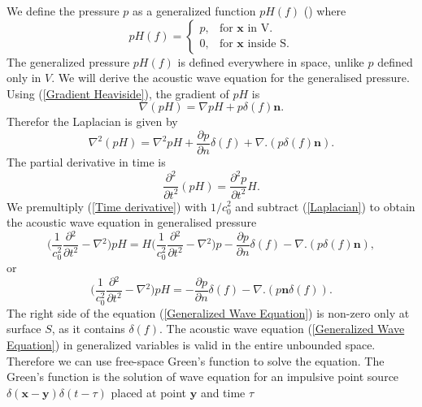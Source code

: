 \documentclass[a4paper]{article}
\begin{document}
We define the pressure $p$ as a generalized function $pH(f)$ (\cite{ffowcs1969sound}) where
\begin{equation}\label{Generalized_Functions}
	p H(f) =\begin{cases}
	p , & \text{for $\mathbf{x}$ in V}.\\
	0, & \text{for $\mathbf{x}$ inside S}.
	\end{cases}
\end{equation}
The generalized pressure $pH(f)$ is defined everywhere in space, unlike $p$ defined only in $V$. We will derive the acoustic wave equation for the generalised pressure. Using (\ref{Gradient Heaviside}), the gradient of $pH$ is
\begin{equation}
	\nabla (pH) = \nabla p H + p \delta(f)\mathbf{n}.
\end{equation}
Therefor the Laplacian is given by
\begin{equation}\label{Laplacian}
	\nabla^2 (pH) = \nabla^2 p H +  \frac{\partial p}{\partial n}\delta(f) + \nabla.(p \delta(f)\mathbf{n}).
\end{equation}
The partial derivative in time is
\begin{equation}\label{Time derivative}
	\frac{\partial^2}{\partial t^2}(pH) = \frac{\partial^2 p }{\partial t^2}H.
\end{equation}
We premultiply (\ref{Time derivative}) with $1/{c_{0}^2}$ and subtract (\ref{Laplacian}) to obtain the acoustic wave equation in generalised pressure
\begin{equation}
	\Bigg( \frac{1}{c_{0}^2}\frac{\partial{}^{2}}{\partial{t}^{2}}- \nabla{}^{2} \Bigg) pH = H\Bigg( \frac{1}{c_{0}^2}\frac{\partial{}^{2}}{\partial{t}^{2}}- \nabla{}^{2} \Bigg) p - \frac{\partial p}{\partial n}\delta(f) - \nabla.(p \delta(f)\mathbf{n}), 
\end{equation}
or
\begin{equation}\label{Generalized Wave Equation}
	\Bigg( \frac{1}{c_{0}^2}\frac{\partial{}^{2}}{\partial{t}^{2}}- \nabla{}^{2} \Bigg) pH = -\frac{\partial p}{\partial n}\delta(f) - \nabla.(p \mathbf{n} \delta(f)). 
\end{equation}
The right side of the equation (\ref{Generalized Wave Equation}) is non-zero only at surface $S$, as it contains $\delta (f)$. The acoustic wave equation (\ref{Generalized Wave Equation}) in generalized variables is valid in the entire unbounded space. Therefore we can use free-space Green's function to solve the equation. The Green's function is the solution of wave equation for an impulsive point source $\delta(\mathbf{x} - \mathbf{y})\delta(t - \tau)$ placed at point $\mathbf{y}$ and time $\tau$
\end{document}
